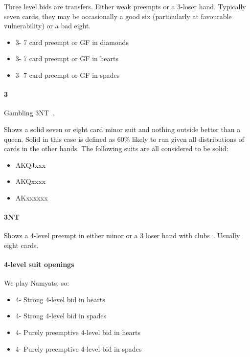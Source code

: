 Three level bids are transfers. Either weak preempts or a 3-loser hand.
Typically seven cards, they may be occasionally a good six (particularly at
favourable vulnerability) or a bad eight.

\begin{itemize}
\item 3\clubs - 7 card preempt or GF in diamonds 
\item 3\diamonds - 7 card preempt or GF in hearts 
\item 3\hearts - 7 card preempt or GF in spades 
\end{itemize}

\paragraph{3\spades}

Gambling 3NT~. 

Shows a solid seven or eight card minor suit and nothing outside better than a
queen.  Solid in this case is defined as 60\% likely to run given all
distributions of cards in the other hands. The following suits are all
considered to be solid:

\begin{itemize}
\item AKQJxxx
\item AKQxxxx
\item AKxxxxxx
\end{itemize}

\paragraph{3NT}

Shows a 4-level preempt in either minor or a 3 loser hand with
clubs~. Usually eight cards. 

\paragraph{4-level suit openings}

We play Namyats, so:

\begin{itemize}
\item 4\clubs - Strong 4-level bid in hearts~
\item 4\diamonds - Strong 4-level bid in spades~
\item 4\hearts - Purely preemptive 4-level bid in hearts
\item 4\spades - Purely preemptive 4-level bid in spades
\end{itemize}


